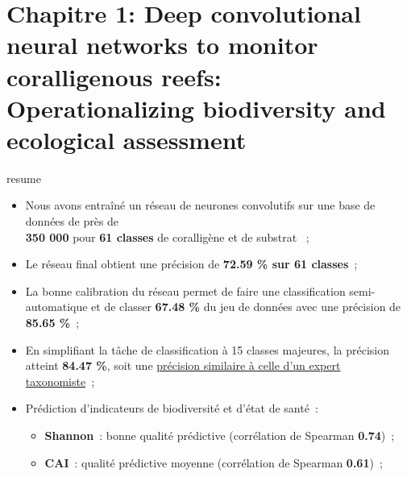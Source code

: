 \chapter[Deep convolutional neural networks to monitor coralligenous reefs: Operationalizing biodiversity and ecological assessment]{Chapitre 1: Deep convolutional neural networks to monitor coralligenous reefs: Operationalizing biodiversity and ecological assessment} \label{chapitre1-deep}

\pagestyle{main}

\begin{center}
\end{center}

\setlength{\fboxsep}{8pt}
\setlength{\fboxrule}{0pt}
\begin{center}
\begin{colbox}{resume}
  \vspace{-2pt}
{\color{textresume}\small
\begin{itemize}[leftmargin=0in]\itemsep3pt
\item Nous avons entraîné un réseau de neurones convolutifs sur une base de données de près de\\ \textbf{350 000} pour \textbf{61 classes} de coralligène et de substrat ~;
\item Le réseau final obtient une précision de \textbf{72.59 \% sur 61 classes}~;
\item La bonne calibration du réseau permet de faire une classification semi-automatique et de classer \textbf{67.48 \%} du jeu de données avec une précision de \textbf{85.65 \%}~;
\item En simplifiant la tâche de classification à 15 classes majeures, la précision atteint \textbf{84.47 \%}, soit une \underline{précision similaire à celle d'un expert taxonomiste}~;
\item Prédiction d'indicateurs de biodiversité et d'état de santé~:
\begin{itemize}
  \item \textbf{Shannon}~: bonne qualité prédictive (corrélation de Spearman \textbf{0.74})~;
  \item \textbf{CAI}~: qualité prédictive moyenne (corrélation de Spearman \textbf{0.61})~;
\end{itemize}
\end{itemize}
}
\vspace{-2pt}
\end{colbox}
\end{center}

